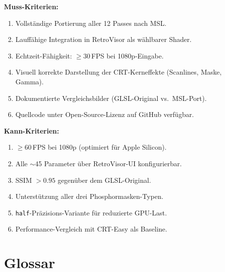 \documentclass[11pt, a4paper]{article}
\begin{document}
\textbf{Muss-Kriterien:} \vspace{.25cm}
\begin{enumerate}[label={\textbf{\color{hkared}M\arabic*}}, nosep]
    \item Vollst\"andige Portierung aller 12 Passes nach MSL. \\
    \item Lauff\"ahige Integration in RetroVisor als w\"ahlbarer Shader. \\
    \item Echtzeit-F\"ahigkeit: $\geq 30$\,FPS bei 1080p-Eingabe. \\
    \item Visuell korrekte Darstellung der CRT-Kerneffekte (Scanlines, Maske, Gamma). \\
    \item Dokumentierte Vergleichsbilder (GLSL-Original vs.\ MSL-Port). \\
    \item Quellcode unter Open-Source-Lizenz auf GitHub verf\"ugbar.
\end{enumerate}

\vspace{.75cm}
\textbf{Kann-Kriterien:} \vspace{.25cm}
\begin{enumerate}[label={\textbf{\color{hkared}K\arabic*}}, nosep]
    \item $\geq 60$\,FPS bei 1080p (optimiert f\"ur Apple Silicon). \\
    \item Alle $\sim$45 Parameter \"uber RetroVisor-UI konfigurierbar. \\
    \item SSIM $> 0.95$ gegen\"uber dem GLSL-Original. \\
    \item Unterst\"utzung aller drei Phosphormasken-Typen. \\
    \item \texttt{half}-Pr\"azisions-Variante f\"ur reduzierte GPU-Last. \\
    \item Performance-Vergleich mit CRT-Easy als Baseline.
\end{enumerate}

\newpage \vspace*{-.75cm}
\section{Glossar}
\vspace{.25cm}
\end{document}

